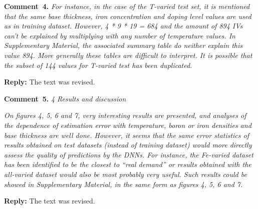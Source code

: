 \documentclass[num-refs]{wiley-article} %
\begin{document}
\vspace{1cm}
\noindent
\textcolor[rgb]{0.00,0.50,1.00}{\textbf{Comment~4.}}
\emph{
For instance, in the case of the T-varied test set, it is mentioned that the same base thickness,
iron concentration and doping level values are used as in training dataset.
However, 4 * 9 * 19 = 684 and the amount of 894 IVs can’t be explained by multiplying with any number of temperature values.
In Supplementary Material, the associated summary table do neither explain this value 894. More generally these tables are difficult to interpret. It is possible that the subset of 144 values for T-varied test has been duplicated. }

\vspace{0.5cm}
\noindent
\textcolor[rgb]{0.51,0.00,0.00}{\textbf{Reply:}}
The text was revised.

\vspace{1cm}
\noindent
\textcolor[rgb]{0.00,0.50,1.00}{\textbf{Comment~5.}}
\emph{4 Results and discussion}

\emph{
On figures 4, 5, 6 and 7, very interesting results are presented, and analyses of the dependence of estimation
error with temperature, boron or iron densities and base thickness are well done.
However, it seems that the same error statistics of results obtained on test datasets
(instead of training dataset) would more directly assess the quality of predictions by the DNNs.
For instance, the Fe-varied dataset has been identified to be
the closest to “real demand” or results obtained with the all-varied dataset would also be most probably very useful.
Such results could be showed in Supplementary Material, in the same form as figures 4, 5, 6 and 7. }

\vspace{0.5cm}
\noindent
\textcolor[rgb]{0.51,0.00,0.00}{\textbf{Reply:}}
The text was revised.
\end{document}

